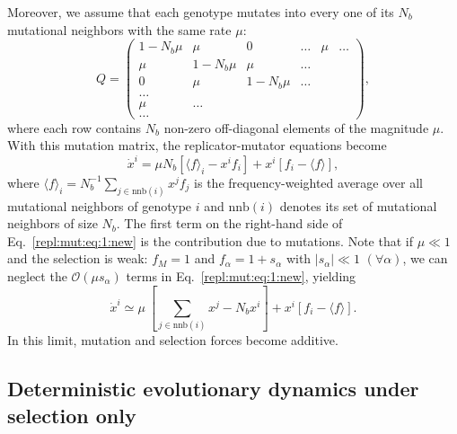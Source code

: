 \documentclass[9pt,twocolumn,twoside]{gsajnl}
\begin{document}
Moreover, we assume that each genotype mutates into every one of its $N_b$ mutational neighbors with the same rate $\mu$:
\begin{equation} \label{Q:1:new}
Q = 
\begin{pmatrix}
1 - N_b \mu & \mu & 0 & \dots & \mu & \dots \\
\mu & 1 - N_b \mu & \mu & \dots \\
0 & \mu & 1 - N_b \mu & \dots \\
\dots & & & \\
\mu & \dots &  & \\
\dots & & &
\end{pmatrix},
\end{equation}
where each row contains $N_b$ non-zero off-diagonal elements of the magnitude $\mu$. With this mutation matrix, the replicator-mutator equations become
\begin{equation} \label{repl:mut:eq:1:new}
\dot{x}^i = \mu N_b \left[ \langle f \rangle_i - x^i f_i \right] + x^i \left[ f_i - \langle f \rangle \right],
\end{equation}
where $\langle f \rangle_i = N_b^{-1} \sum_{j \in \text{nnb} (i)} x^j f_j$ is the frequency-weighted average over all mutational neighbors of genotype $i$ and $\text{nnb} (i)$ denotes its
set of mutational neighbors of size $N_b$. The first term on the right-hand side of Eq.~\eqref{repl:mut:eq:1:new} is the contribution due to mutations. Note that if $\mu \ll 1$ and the selection
is weak: $f_M = 1$ and $f_\alpha = 1 + s_\alpha$  with $|s_\alpha| \ll 1$ $(\forall \alpha)$, we can neglect the $\mathcal{O} (\mu s_\alpha)$ terms in Eq.~\eqref{repl:mut:eq:1:new}, yielding
\begin{equation} \label{repl:mut:eq:2:new}
\dot{x}^i \simeq \mu~[ \!\!\!\sum_{j \in \text{nnb} (i)} x^j - N_b x^i ] + x^i \left[ f_i - \langle f \rangle \right].
\end{equation}
In this limit, mutation and selection forces become additive. %

\subsection{Deterministic evolutionary dynamics under selection only}
\end{document}
